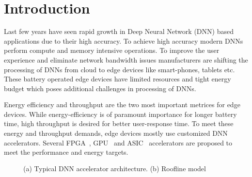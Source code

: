 \documentclass[a4paper,10pt]{article}
\begin{document}

\newpage
\setcounter{tocdepth}{2}
\tableofcontents
\newpage

\section{Introduction}
Last few years have seen rapid growth in Deep Neural Network (DNN) based applications due to their high accuracy. To achieve high accuracy modern DNNs perform compute and memory intensive operations. To improve the user experience and eliminate network bandwidth issues manufacturers are shifting the processing of DNNs from cloud to edge devices like smart-phones, tablets etc. These battery operated edge devices have limited resources and tight energy budget which poses additional challenges in processing of DNNs. 

Energy efficiency and throughput are the two most important metrices for edge devices. While energy-efficiency is of paramount importance for longer battery time, high throughput is desired for better user-response time. To meet these energy and throughput demands, edge devices mostly use customized DNN accelerators.
Several FPGA~\cite{zhang2015optimizing,wei2019overcoming,gokhale2014240,8742284,gupta2015deep,alwani2016fused}, GPU~\cite{chetlur2014cudnn} and ASIC~\cite{Chen2016EyerissAS,chen2014diannao,chen2014dadiannao,du2015shidiannao} accelerators are proposed to meet the performance and energy targets. 
\begin{figure}[!htb]
	\centering
	\hfil
	\caption{(a) Typical DNN accelerator architecture. (b) Roofline model}
	\label{fig:acceleratorAndRoofline}
	\vspace{-1.0em}	
\end{figure}
\end{document}
